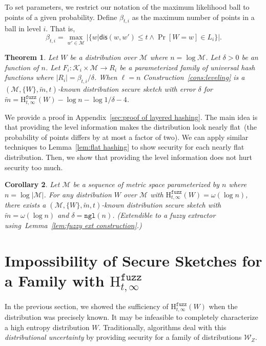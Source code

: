 \documentclass[11pt]{article}
\newcommand{\apref}[1]{\mbox{Appendix~\ref{#1}}}
\newcommand{\lemref}[1]{\mbox{Lemma~\ref{#1}}}
\newcommand{\consref}[1]{\mbox{Construction~\ref{#1}}}
\newcommand{\dis}{\ensuremath{\mathsf{dis}}}
\newcommand{\ngl}{\ensuremath{\mathtt{ngl}}\xspace}
\newcommand{\Hfuzz}{\mathrm{H}^{\mathtt{fuzz}}_{t,\infty}}
\newtheorem{theorem}{Theorem}[section]
\newtheorem{corollary}[theorem]{Corollary}
\newcommand{\M}{\mathcal{M}}
\begin{document}
\noindent
To set parameters, we restrict our notation of the maximum likelihood ball to points of a given probability.  Define $\beta_{t,i}$ as the maximum number of points in a ball in level $i$.  That is,
\[
\beta_{t,i} = \max_{w' \in \mathcal{M}} \left|\{w | \dis(w, w')\le t \wedge \Pr[W=w]\in L_i\}\right|.
\]

\begin{theorem}
\label{thm:layered hashing}
Let $W$ be a distribution over $\mathcal{M}$ where $n =\log \M$.  Let $\delta>0$ be an function of $n$.  Let $F_i: \mathcal{K}_i \times \mathcal{M}\rightarrow R_i$ be a parameterized family of universal hash functions where $|R_i| = \beta_{t,i} /\delta$.  When $\ell = n$ \consref{cons:leveling} is a $(\mathcal{M}, \{W\}, \tilde{m}, t)$-known distribution secure sketch with error $\delta$ for $\tilde{m} = \Hfuzz(W) - \log n - \log 1/\delta - 4$.

\end{theorem}
\noindent
We provide a proof in \apref{sec:proof of layered hashing}.  The main idea is that providing the level information makes the distribution look nearly flat~(the probability of points differs by at most a factor of two).  We can apply similar techniques to \lemref{lem:flat hashing} to show security for each nearly flat distribution. Then, we show that providing the level information does not hurt security too much.

\begin{corollary}
\label{cor:extension to fuzz ext}
Let $\mathcal{M}$ be a sequence of metric space parameterized by $n$ where $n = \log |\M|$.
For any distribution $W$ over $\mathcal{M}$ with $\Hfuzz(W)=\omega(\log n)$, there exists a $(\mathcal{M}, \{W\}, \tilde{m}, t)$-known distribution secure sketch with $\tilde{m} = \omega(\log n)$ and $\delta = \ngl(n)$.  (Extendible to a fuzzy extractor using~\lemref{lem:fuzzy ext construction}.)
\end{corollary}

\section{Impossibility of Secure Sketches for a Family with $\Hfuzz$}
\label{sec:family of dist}

In the previous section, we showed the sufficiency of $\Hfuzz(W)$ when the distribution was precisely known.  It may be infeasible to completely characterize a high entropy distribution $W$.  Traditionally, algorithms deal with this \emph{distributional uncertainty} by providing security for a family of distributions $\mathcal{W}_Z$.  
\end{document}
